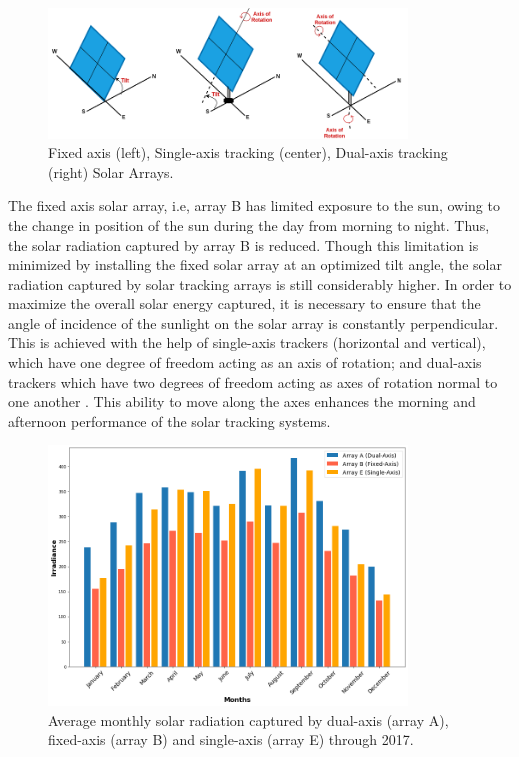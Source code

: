 \begin{figure}[ht]
    \begin{center}
    	\includegraphics[width=0.85\textwidth]{chapter3/fig_pyranometers.png}
    	\caption[Fixed axis, Single-axis tracking, Dual-axis tracking Solar Arrays]{Fixed axis (left), Single-axis tracking (center), Dual-axis tracking (right) Solar Arrays.}
    	\label{fig:fig_pyranometers}
    \end{center}
\end{figure}

The fixed axis solar array, i.e, array B has limited exposure to the sun, owing to the change in position of the sun during the day from morning to night. Thus, the solar radiation captured by array B is reduced. Though this limitation is minimized by installing the fixed solar array at an optimized tilt angle, the solar radiation captured by solar tracking arrays is still considerably higher. In order to maximize the overall solar energy captured, it is necessary to ensure that the angle of incidence of the sunlight on the solar array is constantly perpendicular. This is achieved with the help of single-axis trackers (horizontal and vertical), which have one degree of freedom acting as an axis of rotation; and dual-axis trackers which have two degrees of freedom acting as axes of rotation normal to one another \cite{irradiance_solartracker}. This ability to move along the axes enhances the morning and afternoon performance of the solar tracking systems.

\begin{figure}[ht]
    \begin{center}
    	\includegraphics[width=0.85\textwidth]{chapter3/fig_average_irradiance.png}
    	\caption[Average monthly solar radiation captured by arrays A, B and E through 2017.]{Average monthly solar radiation captured by dual-axis (array A), fixed-axis (array B) and single-axis (array E) through 2017.}
    	\label{fig:fig_average_irradiance}
    \end{center}
\end{figure}

